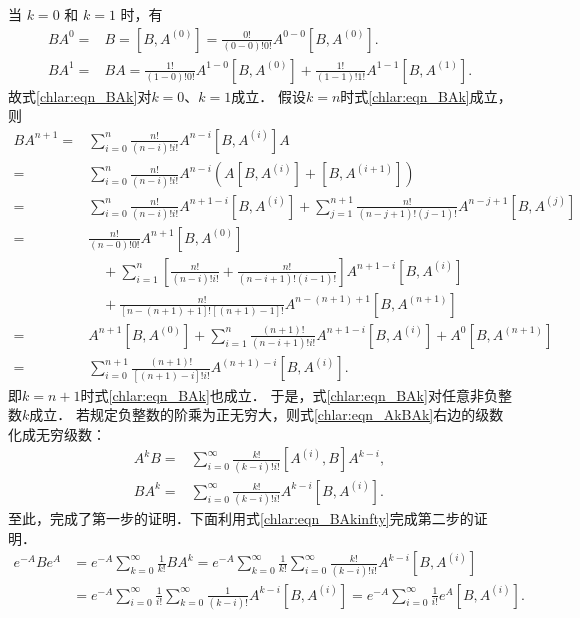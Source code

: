 当 $k=0$ 和 $k=1$ 时，有
\begin{align*}
	B A^0=&B=\left[B, A^{(0)}\right]=\frac{0!}{(0-0)!0!} A^{0-0}\left[B, A^{(0)}\right] .\\
	B A^1=&B A=\frac{1!}{(1-0)!0!} A^{1-0}\left[B, A^{(0)}\right]+\frac{1!}{(1-1)!1!} A^{1-1}\left[B, A^{(1)}\right] .
\end{align*}
故式\eqref{chlar:eqn_BAk}对$k=0$、$k=1$成立．
假设$k=n$时式\eqref{chlar:eqn_BAk}成立，则
\begin{align*}
	B A^{n+1}= & \sum_{i=0}^n \frac{n!}{(n-i)!i!} A^{n-i}\left[B, A^{(i)}\right] A \\
	= & \sum_{i=0}^n \frac{n!}{(n-i)!i!} A^{n-i}\left(A\left[B, A^{(i)}\right]+\left[B, A^{(i+1)}\right]\right) \\
	= & \sum_{i=0}^n \frac{n!}{(n-i)!i!} A^{n+1-i}\left[B, A^{(i)}\right]
	 +\sum_{j=1}^{n+1} \frac{n!}{(n-j+1)!(j-1)!} A^{n-j+1}\left[B, A^{(j)}\right] \\
	= & \frac{n!}{(n-0)!0!} A^{n+1}\left[B, A^{(0)}\right] \\
	&\quad +\sum_{i=1}^n\left[\frac{n!}{(n-i)!i!}+\frac{n!}{(n-i+1)!(i-1)!}\right] A^{n+1-i}\left[B, A^{(i)}\right] \\
	& \quad +\frac{n!}{[n-(n+1)+1]![(n+1)-1]!} A^{n-(n+1)+1}\left[B, A^{(n+1)}\right] \\
	= & A^{n+1}\left[B, A^{(0)}\right]+\sum_{i=1}^n\frac{(n+1)!}{(n-i+1)!i!} A^{n+1-i}\left[B, A^{(i)}\right] 
	 +A^{0}\left[B, A^{(n+1)}\right] \\
	= & \sum_{i=0}^{n+1} \frac{(n+1)!}{[(n+1)-i]!i!} A^{(n+1)-i}\left[B, A^{(i)}\right] .
\end{align*}
即$k=n+1$时式\eqref{chlar:eqn_BAk}也成立．
于是，式\eqref{chlar:eqn_BAk}对任意非负整数$k$成立．
若规定负整数的阶乘为正无穷大，则式\eqref{chlar:eqn_AkBAk}右边的级数化成无穷级数：
\begin{subequations}\label{chlar:eqn_BAkinfty}
	\begin{align}
	A^k B= & \sum_{i=0}^{\infty} \frac{k!}{(k-i)!i!}\left[A^{(i)}, B\right] A^{k-i},  \\
	B A^k= & \sum_{i=0}^{\infty} \frac{k!}{(k-i)!i!} A^{k-i}\left[B, A^{(i)}\right] .
	\end{align}
\end{subequations}
至此，完成了第一步的证明．下面利用式\eqref{chlar:eqn_BAkinfty}完成第二步的证明．
\begin{align*}
	{e}^{-A} B {e}^A & ={e}^{-A} \sum_{k=0}^{\infty} \frac{1}{k!} B A^k
	={e}^{-A} \sum_{k=0}^{\infty} \frac{1}{k!} \sum_{i=0}^{\infty} \frac{k!}{(k-i)!i!} A^{k-i}\left[B, A^{(i)}\right] \\
  & ={e}^{-A} \sum_{i=0}^{\infty} \frac{1}{i!} \sum_{k=0}^{\infty} \frac{1}{(k-i)!} A^{k-i}\left[B, A^{(i)}\right]
	={e}^{-A} \sum_{i=0}^{\infty} \frac{1}{i!} {e}^A\left[B, A^{(i)}\right] .
\end{align*}
